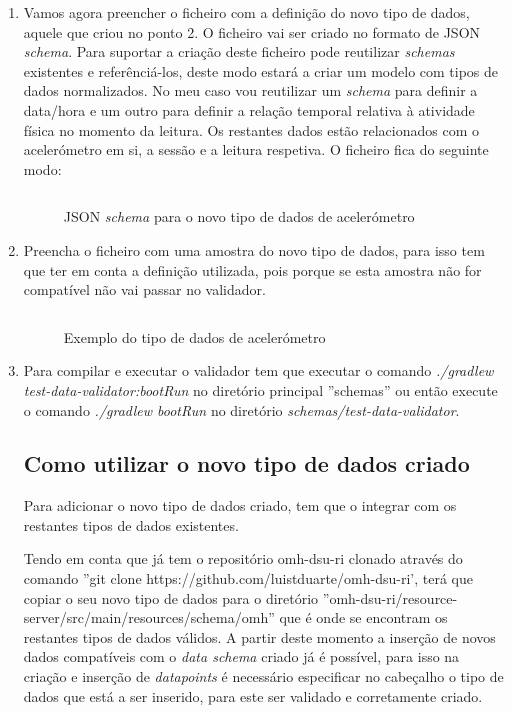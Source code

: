 \begin{enumerate}
\begin{figure}[!ht]
  \label{f:directorynewsample}
\end{figure}
  
\item Vamos agora preencher o ficheiro com a definição do novo tipo de dados, aquele que criou no ponto 2. O ficheiro vai ser criado no formato de \gls{JSON} \textit{schema}. Para suportar a criação deste ficheiro pode reutilizar \textit{schemas} existentes \cite{schema-library} e referênciá-los, deste modo estará a criar um modelo com tipos de dados normalizados. No meu caso vou reutilizar um \textit{schema} para definir a data/hora e um outro para definir a relação temporal relativa à atividade física no momento da leitura. Os restantes dados estão relacionados com o acelerómetro em si, a sessão e a leitura respetiva.
O ficheiro fica do seguinte modo: 

\begin{figure}[H]
\inputminted[fontsize=\scriptsize]{json}{code/accelerometer-1.0.json}
\caption[\gls{JSON} \textit{schema} para o novo tipo de dados de acelerómetro]{\gls{JSON} \textit{schema} para o novo tipo de dados de acelerómetro}
\label{f:accelerometer-json-schema}
\end{figure}

\item Preencha o ficheiro com uma amostra do novo tipo de dados, para isso tem que ter em conta a definição utilizada, pois porque se esta amostra não for compatível não vai passar no validador.

\begin{figure}[H]
\inputminted[fontsize=\scriptsize]{json}{code/example.json}
\caption[Exemplo do tipo de dados de acelerómetro]{Exemplo do tipo de dados de acelerómetro}
\label{f:accelerometer-json-data}
\end{figure}

\item Para compilar e executar o validador tem que executar o comando \textit{./gradlew test-data-validator:bootRun} no diretório principal ''schemas'' ou então execute o comando \textit{./gradlew bootRun} no diretório \textit{schemas/test-data-validator}. 

\subsection{Como utilizar o novo tipo de dados criado}

Para adicionar o novo tipo de dados criado, tem que o integrar com os restantes tipos de dados existentes. \par Tendo em conta que já tem o repositório omh-dsu-ri clonado através do comando ''git clone https://github.com/luistduarte/omh-dsu-ri', terá que copiar o seu novo tipo de dados para o diretório ''omh-dsu-ri/resource-server/src/main/resources/schema/omh'' que é onde se encontram os restantes tipos de dados válidos.
A partir deste momento a inserção de novos dados compatíveis com o \textit{data schema} criado já é possível, para isso na criação e inserção de \textit{datapoints} é necessário especificar no cabeçalho o tipo de dados que está a ser inserido, para este ser validado e corretamente criado.
\end{enumerate}

\cleardoublepage

